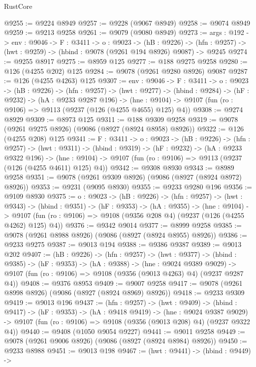 \begin{lexlean}{RustCore}
\begin{coremodule}
@9255 := @9224 @8949
@9257 := @9228 (@9067 @8949)
@9258 := @9074 @8949
@9259 := @9213 @9258
@9261 := @9079 (@9080 @8949)
@9273 := {args : @192} ->
  {env : @9046} ->
  {F : @3411} ->
  {o : @9023} ->
  (hB : @9226) ->
  (hfn : @9257) -> (hwt : @9259) -> (hbind : @9078 (@9261 @194 @8926) @9087) -> @9245
@9274 := @9255 @8917
@9275 := @8959 @125
@9277 := @188 @9275 @9258
@9280 := @126 (@4255 @202) @125
@9284 := @9078 (@9261 @9280 @8926) @9087
@9287 := @126 (@4255 @4263) @125
@9307 := {env : @9046} ->
  {F : @3411} ->
  {o : @9023} ->
  (hB : @9226) ->
  (hfn : @9257) ->
  (hwt : @9277) ->
  (hbind : @9284) ->
  (hF : @9232) ->
  (hA : @9233 @9287 @196) ->
  (hne : @9104) -> @9107 (fun (ro : @9106) => @9113 (@9237 (@126 (@4255 @4655) @125) @4))
@9308 := @9274 @8929
@9309 := @8973 @125
@9311 := @188 @9309 @9258
@9319 := @9078 (@9261 @9275 @8926) (@9086 (@8927 (@8924 @8958) @8926))
@9322 := @126 (@4255 @208) @125
@9341 := {F : @3411} ->
  {o : @9023} ->
  (hB : @9226) ->
  (hfn : @9257) ->
  (hwt : @9311) ->
  (hbind : @9319) ->
  (hF : @9232) ->
  (hA : @9233 @9322 @196) ->
  (hne : @9104) -> @9107 (fun (ro : @9106) => @9113 (@9237 (@126 (@4255 @4611) @125) @4))
@9342 := @9308 @8930
@9343 := @8989 @9258
@9351 := @9078 (@9261 @9309 @8926) (@9086 (@8927 (@8924 @8972) @8926))
@9353 := @9231 (@9095 @8930)
@9355 := @9233 @9280 @196
@9356 := @9109 @8930
@9375 := {o : @9023} ->
  (hB : @9226) ->
  (hfn : @9257) ->
  (hwt : @9343) ->
  (hbind : @9351) ->
  (hF : @9353) ->
  (hA : @9355) ->
  (hne : @9104) ->
  @9107 (fun (ro : @9106) => @9108 (@9356 @208 @4) (@9237 (@126 (@4255 @4262) @125) @4))
@9376 := @9342 @9014
@9377 := @8999 @9258
@9385 := @9078 (@9261 @8988 @8926) (@9086 (@8927 (@8924 @8955) @8926))
@9386 := @9233 @9275
@9387 := @9013 @194
@9388 := @9386 @9387
@9389 := @9013 @202
@9407 := (hB : @9226) ->
  (hfn : @9257) ->
  (hwt : @9377) ->
  (hbind : @9385) ->
  (hF : @9353) ->
  (hA : @9388) ->
  (hne : @9024 @9389 @9029) ->
  @9107 (fun (ro : @9106) => @9108 (@9356 (@9013 @4263) @4) (@9237 @9287 @4))
@9408 := @9376 @8953
@9409 := @9007 @9258
@9417 := @9078 (@9261 @8998 @8926) (@9086 (@8927 (@8924 @8969) @8926))
@9418 := @9233 @9309
@9419 := @9013 @196
@9437 := (hfn : @9257) ->
  (hwt : @9409) ->
  (hbind : @9417) ->
  (hF : @9353) ->
  (hA : @9418 @9419) ->
  (hne : @9024 @9387 @9029) ->
  @9107 (fun (ro : @9106) => @9108 (@9356 (@9013 @208) @4) (@9237 @9322 @4))
@9440 := @9408 (@1050 @9054 @9227)
@9441 := @9011 @9258
@9449 := @9078 (@9261 @9006 @8926) (@9086 (@8927 (@8924 @8984) @8926))
@9450 := @9233 @8988
@9451 := @9013 @198
@9467 := (hwt : @9441) ->
  (hbind : @9449) ->

\end{coremodule}
\end{lexlean}
